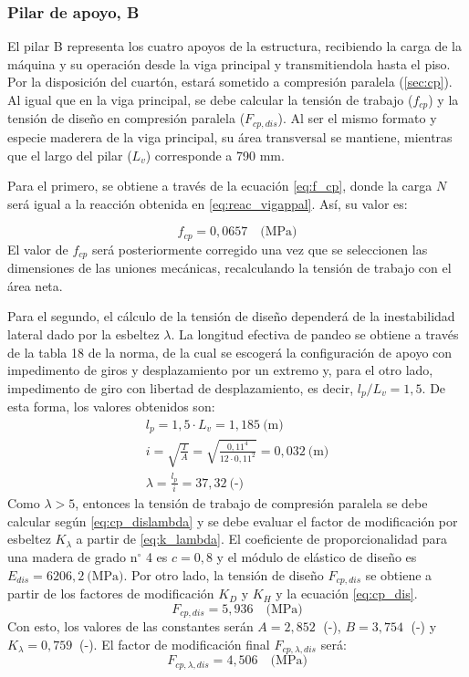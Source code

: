 \subsubsection{Pilar de apoyo, B}
El pilar B representa los cuatro apoyos de la estructura, recibiendo la carga de la máquina y su operación desde la viga principal y transmitiendola hasta el piso. Por la disposición del cuartón, estará sometido a compresión paralela (\ref{sec:cp}). Al igual que en la viga principal, se debe calcular la tensión de trabajo ($f_{cp}$) y la tensión de diseño en compresión paralela ($F_{cp,dis}$). Al ser el mismo formato y especie maderera de la viga principal, su área transversal se mantiene, mientras que el largo del pilar ($L_v$) corresponde a 790 mm.

Para el primero, se obtiene a través de la ecuación \ref{eq:f_cp}, donde la carga $N$ será igual a la reacción obtenida en \ref{eq:reac_vigappal}. Así, su valor es:


\begin{equation}
	f_{cp} = 0,0657 \quad \text{(MPa)} 
\end{equation}
El valor de $f_{cp}$ será posteriormente corregido una vez que se seleccionen las dimensiones de las uniones mecánicas, recalculando la tensión de trabajo con el área neta.

Para el segundo, el cálculo de la tensión de diseño dependerá de la inestabilidad lateral dado por la esbeltez $\lambda$. La longitud efectiva de pandeo se obtiene a través de la tabla 18 de la norma, de la cual se escogerá la configuración de apoyo con impedimento de giros y desplazamiento por un extremo y, para el otro lado, impedimento de giro con libertad de desplazamiento, es decir, $l_p/L_v = 1,5$. De esta forma, los valores obtenidos son:
\begin{gather*}
	l_p = 1,5\cdot L_v = 1,185 \: \text{(m)}\\
	i = \sqrt{\frac{I}{A}} = \sqrt{\frac{0,11^4}{12\cdot 0,11^2}} = 0,032 \: \text{(m)}\\
	\lambda = \frac{l_p}{i} = 37,32 \: \text{(-)}
\end{gather*}
Como $\lambda > 5$, entonces la tensión de trabajo de compresión paralela se debe calcular según \ref{eq:cp_dislambda} y se debe evaluar el factor de modificación por esbeltez $K_{\lambda}$ a partir de \ref{eq:k_lambda}. El coeficiente de proporcionalidad para una madera de grado n$^{\circ}$ 4 es $c = 0,8$ y el módulo de elástico de diseño es $E_{dis} = 6206,2\: \text{(MPa)}$. Por otro lado, la tensión de diseño $F_{cp,dis}$ se obtiene a partir de los factores de modificación $K_D$ y $K_H$ y la ecuación \ref{eq:cp_dis}.
\begin{equation}
	F_{cp,dis} = 5,936 \quad \text{(MPa)}
\end{equation}
Con esto, los valores de las constantes serán $A = 2,852\;$ (-), $B = 3,754\;$ (-) y $K_{\lambda} = 0,759\:$ (-). El factor de modificación final $F_{cp,\lambda, dis}$ será:
\begin{equation}
	F_{cp,\lambda, dis} = 4,506 \quad \text{(MPa)}
\end{equation}

